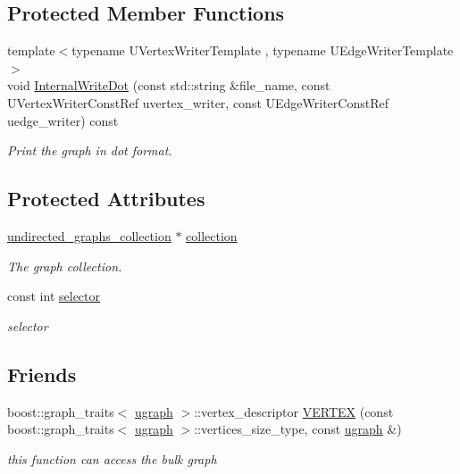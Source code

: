 \subsection*{Protected Member Functions}
\begin{DoxyCompactItemize}
\item 
{\footnotesize template$<$typename U\+Vertex\+Writer\+Template , typename U\+Edge\+Writer\+Template $>$ }\\void \hyperlink{structugraph_a8a91921c8f9c459cbcd24c8ade0b6c77}{Internal\+Write\+Dot} (const std\+::string \&file\+\_\+name, const U\+Vertex\+Writer\+Const\+Ref uvertex\+\_\+writer, const U\+Edge\+Writer\+Const\+Ref uedge\+\_\+writer) const
\begin{DoxyCompactList}\small\item\em Print the graph in dot format. \end{DoxyCompactList}\end{DoxyCompactItemize}
\subsection*{Protected Attributes}
\begin{DoxyCompactItemize}
\item 
\hyperlink{structundirected__graphs__collection}{undirected\+\_\+graphs\+\_\+collection} $\ast$ \hyperlink{structugraph_a91e0c8dfe12282bf0b18d38dbac3384a}{collection}
\begin{DoxyCompactList}\small\item\em The graph collection. \end{DoxyCompactList}\item 
const int \hyperlink{structugraph_a82bc54b16ffb1a67e1c2e05c98c4b2e6}{selector}
\begin{DoxyCompactList}\small\item\em selector \end{DoxyCompactList}\end{DoxyCompactItemize}
\subsection*{Friends}
\begin{DoxyCompactItemize}
\item 
boost\+::graph\+\_\+traits$<$ \hyperlink{structugraph}{ugraph} $>$\+::vertex\+\_\+descriptor \hyperlink{structugraph_a751e85018780aa0741d741826df53904}{V\+E\+R\+T\+EX} (const boost\+::graph\+\_\+traits$<$ \hyperlink{structugraph}{ugraph} $>$\+::vertices\+\_\+size\+\_\+type, const \hyperlink{structugraph}{ugraph} \&)
\begin{DoxyCompactList}\small\item\em this function can access the bulk graph \end{DoxyCompactList}\end{DoxyCompactItemize}


